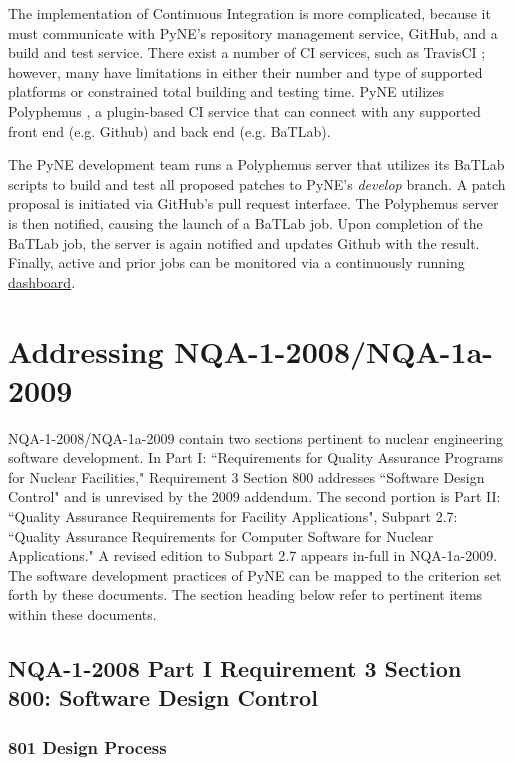 \documentclass{anstrans}
\begin{document}
The implementation of Continuous Integration is more complicated, because it
must communicate with PyNE's repository management service, GitHub, and a build
and test service. There exist a number of CI services, such as TravisCI
\cite{travis_2014}; however, many have limitations in either their number and
type of supported platforms or constrained total building and testing time. PyNE
utilizes Polyphemus \cite{polyphemus_2014}, a plugin-based CI service that can
connect with any supported front end (e.g. Github) and back end (e.g. BaTLab).

The PyNE development team runs a Polyphemus server that utilizes its BaTLab
scripts to build and test all proposed patches to PyNE's \textit{develop}
branch. A patch proposal is initiated via GitHub's pull request
interface. The Polyphemus server is then notified, causing the launch of a
BaTLab job. Upon completion of the BaTLab job, the server is again notified and
updates Github with the result. Finally, active and prior jobs can be monitored
via a continuously running \href{http://gorgus.pyne.io/dashboard}{dashboard}.


\section{Addressing NQA-1-2008/NQA-1a-2009}

NQA-1-2008/NQA-1a-2009 contain two sections pertinent to nuclear engineering
software development. In Part I: ``Requirements for Quality Assurance Programs
for Nuclear Facilities," Requirement 3 Section 800 addresses ``Software Design
Control" and is unrevised by the 2009 addendum. The second portion is Part II:
``Quality Assurance Requirements for Facility Applications", Subpart 2.7:
``Quality Assurance Requirements for Computer Software for Nuclear
Applications." A revised edition to Subpart 2.7 appears in-full in NQA-1a-2009.
The software development practices of PyNE can be mapped to the criterion set
forth by these documents.  The section heading below refer to pertinent items
within these documents.

\subsection{NQA-1-2008 Part I Requirement 3 Section 800: Software Design Control}

\subsubsection{801 Design Process}
\end{document}
